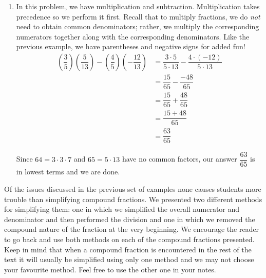 {\begin{enumerate}
This means that we should simplify the numerator and denominator first, then perform the division last.  We tend to what's in parentheses first, giving multiplication priority over addition and subtraction.
\begin{align*}
\dfrac{(2(2)+1)(-3-(-3)) - 5(4-7)}{4-2(3)} & =  \dfrac{(4+1)(-3+3)-5(-3)}{4 - 6}   \\
	& =  \dfrac{(5)(0) + 15}{-2}   \\ 
	& =  \dfrac{15}{-2}  \\[5pt] 
	& =  -\dfrac{15}{2}  \tag*{Properties of Negatives}
\end{align*}
Since $15 = 3\cdot 5$ and $2$ have no common factors, we are done.
																			



\item  In this problem, we have multiplication and subtraction.  Multiplication takes precedence so we perform it first.  Recall that to multiply fractions, we do \textit{not} need to obtain common denominators;  rather, we multiply the corresponding numerators together along with the corresponding denominators.  Like the previous example, we have parentheses and negative signs for added fun!
\begin{align*}
\left(\dfrac{3}{5} \right) \left(\dfrac{5}{13} \right) - \left(\dfrac{4}{5}\right) \left( - \dfrac{12}{13}\right) & =  \dfrac{3 \cdot 5}{5 \cdot 13} - \dfrac{4\cdot (-12)}{5 \cdot 13}  \tag*{Multiply fractions}\\[5pt] 
& =  \dfrac{15}{65} - \dfrac{-48}{65}  \\[5pt]
& =  \dfrac{15}{65} + \dfrac{48}{65}  \tag*{Properties of Negatives}\\[5pt]
& =  \dfrac{15+48}{65}   \tag*{Add numerators} \\[5pt] 
& =  \dfrac{63}{65} 
\end{align*}

Since $64 = 3 \cdot 3 \cdot 7$ and $65 = 5 \cdot 13$ have no common factors, our answer $\dfrac{63}{65}$ is in lowest terms and we are done.
\end{enumerate}
} 

\medskip

Of the issues discussed in the previous set of examples none causes students more trouble than simplifying compound fractions.  We presented two different methods for simplifying them:  one in which we simplified the overall numerator and denominator and then performed the division and one in which we removed the compound nature of the fraction at the very beginning.   We encourage the reader to go back and use both methods on each of the compound fractions presented.  Keep in mind that when a compound fraction is encountered in the rest of the text it will usually be simplified using only one method and we may not choose your favourite method.  Feel free to use the other one in your notes.

